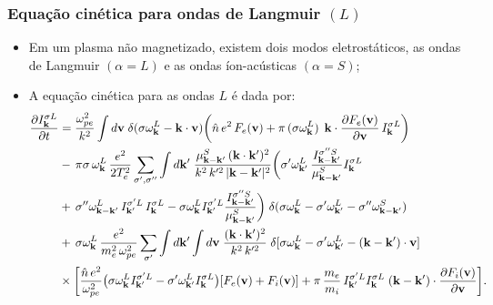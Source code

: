 \documentclass[10pt,aspectratio=1610,lualatex]{beamer}
\begin{document}
\begin{frame}
  \frametitle{Equação cinética para ondas de Langmuir $(L)$}
  \begin{itemize}
    \item Em um plasma não magnetizado, existem dois modos eletrostáticos,
    as ondas de Langmuir $(\alpha=L)$ e as ondas íon-acústicas $(\alpha=S)$;
    \pause
    \item A equação cinética para as ondas $L$ é dada por:
      \begin{equation*}
	\label{L}
	\begin{split}
	  \frac{\partial I_{\bf k}^{\sigma L}}{\partial t}
	  &=\frac{\omega_{pe}^2}{k^2}\int d{\bf v}\;
	  \delta(\sigma\omega_{\bf k}^L-{\bf k}\cdot{\bf v})
	  \biggl(\hat{n}\,e^2\,F_e({\bf v})+\pi\,(\sigma\omega_{\bf k}^L)\,
	  \;{\bf k}\cdot\frac{\partial F_e({\bf v})}{\partial{\bf v}}
	  \,I_{\bf k}^{\sigma L}\biggr)\\
	  &-\,\pi\sigma\,\omega_{\bf k}^L\,
	  \frac{e^2}{2T_e^2}\sum_{\sigma ',\sigma ''}\int d{\bf k'}\;
	  \frac{\mu_{{\bf k}-{\bf k}'}^S \,({\bf k}\cdot{\bf k}')^2}
	  {k^2\,k'^2\,|{\bf k}-{\bf k}'|^2}\biggl(\sigma '\omega_{{\bf k}'}^L\,
	  \frac{I_{{\bf k}-{\bf k}'}^{\sigma ''S}}{\mu_{{\bf k}-{\bf k}'}^S}
	  I_{\bf k}^{\sigma L}\\
	  &+\,\sigma ''\omega_{{\bf k}-{\bf k}'}^L \,I_{{\bf k}'}^{\sigma 'L}\,
	  I_{\bf k}^{\sigma L}-\sigma\omega_{\bf k}^L I_{{\bf k}'}^{\sigma 'L}
	  \frac{I_{{\bf k}-{\bf k}'}^{\sigma ''S}}{\mu_{{\bf k}-{\bf k}'}^S}\biggr)\;
	  \delta(\sigma\omega_{\bf k}^L-\sigma '\omega_{{\bf k}'}^L
	  -\sigma ''\omega_{{\bf k}-{\bf k}'}^S)\\
	  &+\,\sigma\omega_{\bf k}^L\,\frac{e^2}{m_e^2\,\omega_{pe}^2}
	  \sum_{\sigma '}\int d{\bf k'}\int d{\bf v}\;
	  \frac{({\bf k}\cdot{\bf k}')^2}{k^2\,k'^2}\;
	  \delta[\sigma\omega_{\bf k}^L
	  -\sigma '\omega_{{\bf k}'}^L-({\bf k}-{\bf k}')\cdot{\bf v}]\\
	  &\times\biggl[\frac{\hat{n}\,e^2}{\omega_{pe}^2}
	  \bigl(\sigma\omega_{\bf k}^LI_{{\bf k}'}^{\sigma 'L} -\sigma
	  '\omega_{{\bf k}'}^L I_{\bf k}^{\sigma L}\bigr) [F_e({\bf v})+F_i({\bf v})]
	  +\pi\,\frac{m_e}{m_i}\,I_{{\bf k}'}^{\sigma 'L} I_{\bf k}^{\sigma L}\;
	  ({\bf k}-{\bf k}')\cdot
	  \frac{\partial F_i({\bf v})}{\partial{\bf v}}\biggr].
	\end{split}
      \end{equation*}
  \end{itemize}
\end{frame}
\end{document}
